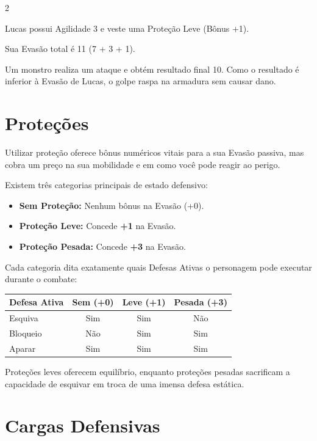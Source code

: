 \documentclass[a4paper,11pt,openany]{book}
\begin{document}
\begin{multicols}{2}
\begin{exemplo}
Lucas possui Agilidade 3 e veste uma Proteção Leve (Bônus +1). 

Sua Evasão total é 11 (7 + 3 + 1).

Um monstro realiza um ataque e obtém resultado final 10. Como o resultado é inferior à Evasão de Lucas, o golpe raspa na armadura sem causar dano.
\end{exemplo}

\section{Proteções}

Utilizar proteção oferece bônus numéricos vitais para a sua Evasão passiva, mas cobra um preço na sua mobilidade e em como você pode reagir ao perigo.

Existem três categorias principais de estado defensivo:

\begin{itemize}
\item \textbf{Sem Proteção:} Nenhum bônus na Evasão (+0).
\item \textbf{Proteção Leve:} Concede \textbf{+1} na Evasão.
\item \textbf{Proteção Pesada:} Concede \textbf{+3} na Evasão.
\end{itemize}

Cada categoria dita exatamente quais Defesas Ativas o personagem pode executar durante o combate:
\setlength{\tabcolsep}{4pt} %
\begin{table}[H]
\centering
\sffamily
{}
\begin{tabular}{lccc}
\toprule
\textbf{Defesa Ativa} & \textbf{Sem (+0)} & \textbf{Leve (+1)} & \textbf{Pesada (+3)} \\
\midrule
Esquiva & Sim & Sim & Não \\
Bloqueio & Não & Sim & Sim \\
Aparar & Sim & Sim & Sim \\
\bottomrule
\end{tabular}
\end{table}

Proteções leves oferecem equilíbrio, enquanto proteções pesadas sacrificam a capacidade de esquivar em troca de uma imensa defesa estática.

\section{Cargas Defensivas}


\end{multicols}
\end{document}
